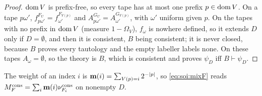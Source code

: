 \begin{proof}
$\operatorname{dom} V$ is prefix-free, so every tape has at most one prefix $p\in\operatorname{dom} V$. On a tape $p\omega'$, $f^{F_U}_{p\omega'}=f^{F_{V(p)}}_{\omega'}$ and $A^{G_U}_{p\omega'}=A^{G_{V(p)}}_{\omega'}$, with $\omega'$ uniform given $p$. On the tapes with no prefix in $\operatorname{dom} V$ (measure $1-\Omega_V$), $f_\omega$ is nowhere defined, so it extends $D$ only if $D=\emptyset$, and then it is consistent, $B$ being consistent; it is never closed, because $B$ proves every tautology and the empty labeller labels none. On these tapes $A_\omega=\emptyset$, so the theory is $B$, which is consistent and proves $\psi_D$ iff $B\vdash\psi_D$.
\end{proof}

The weight of an index $i$ is $\mathbf{m}(i)=\sum_{V(p)=i}2^{-\lvert p\rvert}$, so \eqref{eq:soi:mixF} reads $M_{F}^{\mathrm{cons}}=\sum_i\mathbf{m}(i)\nu^{\mathrm{cons}}_{F_i}$ on nonempty $D$.

